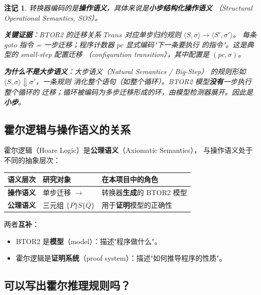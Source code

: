 \documentclass[11pt,a4paper]{article}
\newtheorem{remark}{注记}[section]
\newcommand{\Trans}{\mathit{Trans}}
\begin{document}
\begin{remark}
  转换器编码的是\textbf{操作语义}，具体来说是\textbf{小步结构化操作语义}
  （Structural Operational Semantics, SOS）。

  \textbf{关键证据}：BTOR2 的迁移关系 $\Trans$ 对应单步归约规则
  $\langle S, \sigma \rangle \to \langle S', \sigma' \rangle$。
  每条 goto 指令 = 一步迁移；程序计数器 $\mathit{pc}$ 显式编码"下一条要执行
  的指令"。这是典型的 small-step 配置迁移
  （configuration transition），其中配置是 $(\mathit{pc}, \sigma)$。

  \textbf{为什么不是大步语义}：大步语义（Natural Semantics / Big-Step）
  的规则形如 $\langle S, \sigma \rangle \Downarrow \sigma'$，一条规则
  消化整个语句（如整个循环）。BTOR2 模型\textbf{没有}一步执行整个循环的
  迁移；循环被编码为多步迁移形成的环，由模型检测器展开。因此是\textbf{小步}。
\end{remark}

\subsection{霍尔逻辑与操作语义的关系}

霍尔逻辑（Hoare Logic）是\textbf{公理语义}（Axiomatic Semantics），
与操作语义处于不同的抽象层次：

\begin{center}
\renewcommand{\arraystretch}{1.3}
\begin{tabular}{>{\bfseries}l l l}
  \toprule
  语义层次 & 研究对象 & 在本项目中的角色 \\
  \midrule
  操作语义 & 单步迁移 $\to$ & 转换器\textbf{生成}的 BTOR2 模型 \\
  公理语义 & 三元组 $\{P\}S\{Q\}$ & 用于\textbf{证明}模型的正确性 \\
  \bottomrule
\end{tabular}
\end{center}

两者\textbf{互补}：
\begin{itemize}
  \item BTOR2 是\textbf{模型}（model）：描述"程序做什么"。
  \item 霍尔逻辑是\textbf{证明系统}（proof system）：描述"如何推导程序的性质"。
\end{itemize}

\subsection{可以写出霍尔推理规则吗？}
\end{document}

